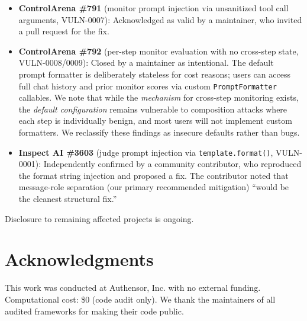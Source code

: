 \documentclass[10pt]{article}
\begin{document}
\begin{itemize}[leftmargin=*,itemsep=2pt]
  \item \textbf{ControlArena \#791} (monitor prompt injection via unsanitized tool call arguments, VULN-0007): Acknowledged as valid by a maintainer, who invited a pull request for the fix.
  \item \textbf{ControlArena \#792} (per-step monitor evaluation with no cross-step state, VULN-0008/0009): Closed by a maintainer as intentional.
  The default prompt formatter is deliberately stateless for cost reasons; users can access full chat history and prior monitor scores via custom \texttt{PromptFormatter} callables.
  We note that while the \emph{mechanism} for cross-step monitoring exists, the \emph{default configuration} remains vulnerable to composition attacks where each step is individually benign, and most users will not implement custom formatters.
  We reclassify these findings as insecure defaults rather than bugs.
  \item \textbf{Inspect AI \#3603} (judge prompt injection via \texttt{template.format()}, VULN-0001): Independently confirmed by a community contributor, who reproduced the format string injection and proposed a fix.
  The contributor noted that message-role separation (our primary recommended mitigation) ``would be the cleanest structural fix.''
\end{itemize}

\noindent Disclosure to remaining affected projects is ongoing.

\section*{Acknowledgments}

This work was conducted at Authensor, Inc. with no external funding.
Computational cost: \$0 (code audit only).
We thank the maintainers of all audited frameworks for making their code public.



\end{document}
